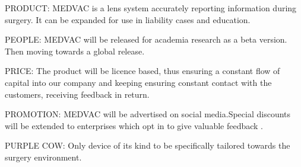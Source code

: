 \documentclass{article}
\begin{document}
PRODUCT:
MEDVAC is a lens system accurately reporting information during surgery. It can be expanded for use in liability cases and education.

PEOPLE:
MEDVAC will be released for academia research as a beta version. Then moving towards a global release.

PRICE:
The product will be licence based, thus ensuring a constant flow of capital into our company and keeping ensuring constant contact with the customers, receiving feedback in return.

PROMOTION:
MEDVAC will be advertised on social media.Special discounts will be extended to enterprises which opt in to give valuable feedback .

PURPLE COW:
Only device of its kind to be specifically tailored towards the surgery environment.



	
\end{document}
